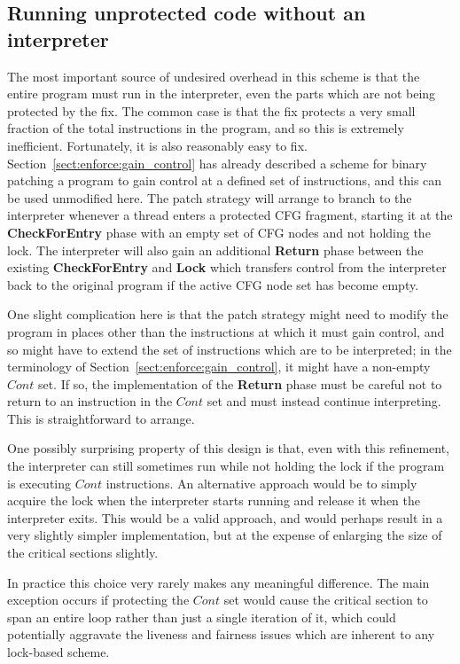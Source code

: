 \subsection{Running unprotected code without an interpreter}

The most important source of undesired overhead in this scheme is that
the entire program must run in the interpreter, even the parts which
are not being protected by the fix.  The common case is that the fix
protects a very small fraction of the total instructions in the
program, and so this is extremely inefficient.  Fortunately, it is
also reasonably easy to fix.  Section~\ref{sect:enforce:gain_control}
has already described a scheme for binary patching a program to gain
control at a defined set of instructions, and this can be used
unmodified here.  The patch strategy will arrange to branch to the
interpreter whenever a thread enters a protected CFG fragment,
starting it at the \textbf{CheckForEntry} phase with an empty set of
CFG nodes and not holding the lock.  The interpreter will also gain an
additional \textbf{Return} phase between the existing
\textbf{CheckForEntry} and \textbf{Lock} which transfers control from
the interpreter back to the original program if the active CFG node
set has become empty.

One slight complication here is that the patch strategy might need to
modify the program in places other than the instructions at which it
must gain control, and so might have to extend the set of instructions
which are to be interpreted; in the terminology of
Section~\ref{sect:enforce:gain_control}, it might have a non-empty
$\mathit{Cont}$ set.  If so, the implementation of the \textbf{Return}
phase must be careful not to return to an instruction in the
$\mathit{Cont}$ set and must instead continue interpreting.  This is
straightforward to arrange.

One possibly surprising property of this design is that, even with
this refinement, the interpreter can still sometimes run while not
holding the lock if the program is executing $\mathit{Cont}$
instructions.  An alternative approach would be to simply acquire the
lock when the interpreter starts running and release it when the
interpreter exits.  This would be a valid approach, and would perhaps
result in a very slightly simpler implementation, but at the expense
of enlarging the size of the critical sections slightly.

In practice this choice very rarely makes any meaningful difference.
The main exception occurs if protecting the $\mathit{Cont}$ set would
cause the critical section to span an entire loop rather than just a
single iteration of it, which could potentially aggravate the liveness
and fairness issues which are inherent to any lock-based scheme.

